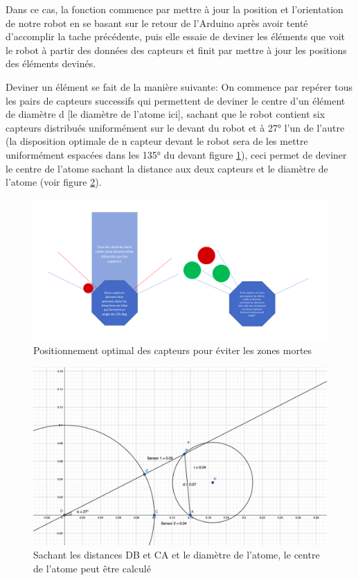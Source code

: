 \documentclass{article}
\begin{document}
Dans ce cas, la fonction commence par mettre à jour la position et l'orientation de notre robot en se basant sur le retour de l'Arduino après avoir tenté d'accomplir la tache précédente, puis elle essaie de deviner les éléments que voit le robot à partir des données des capteurs et finit par mettre à jour les positions des éléments devinés.

Deviner un élément se fait de la manière suivante:
On commence par repérer tous les pairs de capteurs successifs qui permettent de deviner le centre d'un élément de diamètre d [le diamètre de l'atome ici], sachant que le robot contient six capteurs distribués uniformément sur le devant du robot et à 27° l'un de l'autre (la disposition optimale de n capteur devant le robot sera de les mettre uniformément espacées dans les 135° du devant figure \ref{fig:calcAngles}), ceci permet de deviner le centre de l'atome sachant la distance aux deux capteurs et le diamètre de l'atome (voir figure \ref{fig:calcDist}). 

\begin{figure}[!h]
\centering
\includegraphics[scale=0.3]{calcAngles}
\caption{Positionnement optimal des capteurs pour éviter les zones mortes}
\label{fig:calcAngles}
\end{figure}

\begin{figure}[!h]
\centering
\includegraphics[scale=0.27]{calcDist}
\caption{Sachant les distances DB et CA et le diamètre de l'atome, le centre de l'atome peut être calculé}
\label{fig:calcDist}
\end{figure}
\end{document}
